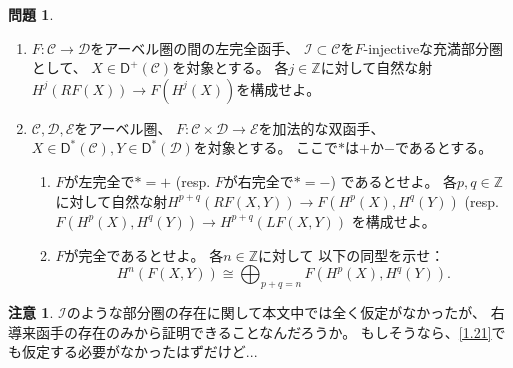 \documentclass[uplatex,dvipdfmx]{jsarticle}
\theoremstyle{definition}
\newtheorem{prob}[prob]{問題}
\newtheorem*{rem*}{注意}
\newcommand{\sfD}{\mathsf{D}}
\newcommand\Z{\mathbb{Z}}
\newcommand\mcC{\mathcal{C}}
\newcommand\mcD{\mathcal{D}}
\newcommand\mcE{\mathcal{E}}
\newcommand\mcI{\mathcal{I}}
\begin{document}
\begin{prob}\label{1.24}
  \
  \begin{enumerate}
    \item \label{1.24.1}
    \(F:\mcC\to \mcD\)をアーベル圏の間の左完全函手、
    \(\mcI\subset \mcC\)を\(F\)-injectiveな充満部分圏として、
    \(X\in \sfD^+(\mcC)\)を対象とする。
    各\(j\in \Z\)に対して自然な射\(H^j(RF(X)) \to F(H^j(X))\)を構成せよ。
    \item \label{1.24.2}
    \(\mcC,\mcD,\mcE\)をアーベル圏、
    \(F:\mcC\times \mcD\to \mcE\)を加法的な双函手、
    \(X\in \sfD^*(\mcC), Y\in \sfD^*(\mcD)\)を対象とする。
    ここで\(*\)は\(+\)か\(-\)であるとする。
    \begin{enumerate}
      \item \label{1.24.2.1}
      \(F\)が左完全で\(*=+\)
      (resp. \(F\)が右完全で\(*=-\))
      であるとせよ。
      各\(p,q\in \Z\)に対して自然な射\(H^{p+q}(RF(X,Y)) \to F(H^p(X),H^q(Y))\)
      (resp. \(F(H^p(X),H^q(Y)) \to H^{p+q}(LF(X,Y))\)
      を構成せよ。
      \item \label{1.24.2.2}
      \(F\)が完全であるとせよ。
      各\(n\in \Z\)に対して
      以下の同型を示せ：
      \[
      H^n(F(X,Y)) \cong \bigoplus_{p+q=n}F(H^p(X),H^q(Y)).
      \]
    \end{enumerate}
  \end{enumerate}
\end{prob}

\begin{rem*}
  \(\mcI\)のような部分圏の存在に関して本文中では全く仮定がなかったが、
  右導来函手の存在のみから証明できることなんだろうか。
  もしそうなら、\autoref{1.21}でも仮定する必要がなかったはずだけど...
\end{rem*}
\end{document}
